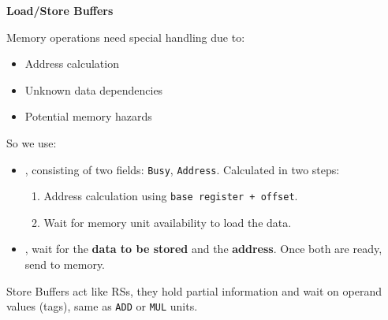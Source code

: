 \highspace
\begin{flushleft}
    \textcolor{Green3}{ \textbf{Load/Store Buffers}}
\end{flushleft}
Memory operations need special handling due to:
\begin{itemize}
    \item Address calculation
    \item Unknown data dependencies
    \item Potential memory hazards
\end{itemize}
So we use:
\begin{itemize}
    \item {}, consisting of two fields: \texttt{Busy}, \texttt{Address}. Calculated in two steps:
    \begin{enumerate}
        \item Address calculation using \texttt{base register + offset}.
        \item Wait for memory unit availability to load the data.
    \end{enumerate}
    \item {}, wait for the \textbf{data to be stored} and the \textbf{address}. Once both are ready, send to memory.
\end{itemize}
Store Buffers act like RSs, they hold partial information and wait on operand values (tags), same as \texttt{ADD} or \texttt{MUL} units.

